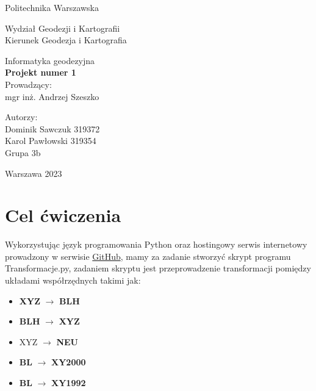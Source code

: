 \documentclass[a4paper,titleauthor]{mwart}
\begin{document}
\thispagestyle{empty}
\begin{center}{\sc \Large
Politechnika Warszawska\\
}\par\vspace{0.2cm}\par
{\large
Wydział Geodezji i Kartografii\\
Kierunek Geodezja i Kartografia

}\end{center}
\vspace{5cm}
\begin{center}

{\LARGE
 Informatyka geodezyjna\\
\textbf{Projekt numer 1}\\

Prowadzący:\\
mgr inż. Andrzej Szeszko\\

}
\end{center}
\vspace{4cm}
\begin{flushright}

{\large
Autorzy:\\
Dominik Sawczuk 319372\\
Karol Pawłowski 319354 \\
Grupa 3b\\
}
\end{flushright}
\vfill
\begin{center}
Warszawa 2023
\end{center}

\newpage

\tableofcontents
\newpage
\section{Cel ćwiczenia} 
Wykorzystując język programowania Python oraz hostingowy serwis internetowy prowadzony w serwisie \href{https://github.com/Grabarzd/Projekt1}{GitHub}, mamy za zadanie stworzyć skrypt programu Transformacje.py, zadaniem skryptu jest przeprowadzenie transformacji pomiędzy układami współrzędnych takimi jak:
\begin{itemize}
    \item \textbf{XYZ} $\rightarrow$ \textbf{BLH}
    \item \textbf{BLH} $\rightarrow$ \textbf{XYZ}
    \item XYZ $\rightarrow$ \textbf{NEU}
    \item \textbf{BL} $\rightarrow$ \textbf{XY2000}
    \item \textbf{BL} $\rightarrow$ \textbf{XY1992}
\end{itemize}
\end{document}
